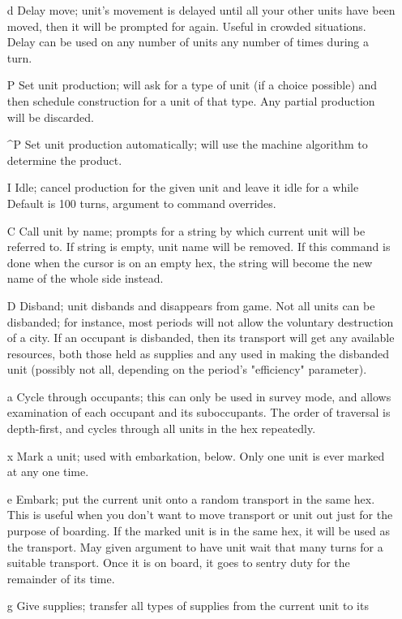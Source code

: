 \begin{itemize}
\item[{d}]
Delay move; unit's movement is delayed until all your other units have been
moved, then it will be prompted for again.  Useful in crowded situations.
Delay can be used on any number of units any number of times during a turn.
\item[{P}]
Set unit production; will ask for a type of unit (if a choice possible) 
and then schedule construction
for a unit of that type.
Any partial production will be discarded.
\item[{\^{}P}]
Set unit production automatically; will use the machine algorithm to
determine the product.  
\item[{I}]
Idle;  cancel production for the given unit and leave it idle for a while
Default is 100 turns, argument to command overrides.
\item[{C}]
Call unit by name; prompts for a string by which current unit
will be referred to.
If string is empty, unit name will be removed.
If this command is done when the cursor is on an empty hex, the string will
become the new name of the whole side instead.
\item[{D}]
Disband; unit disbands and disappears from game.
Not all units can be disbanded; for instance, most periods will not allow
the voluntary destruction of a city.  If an occupant is disbanded, then its
transport will get any available resources, both those held as supplies and
any used in making the disbanded unit (possibly not all, depending on the
period's "efficiency" parameter).
\item[{a}]
Cycle through occupants; this can only be used in survey mode, and allows
examination of each occupant and its suboccupants.  The order of traversal
is depth-first, and cycles through all units in the hex repeatedly.
\item[{x}]
Mark a unit; used with embarkation, below.  Only one unit is ever marked at
any one time.
\item[{e}]
Embark; put the current unit onto a random transport in the same hex.
This is useful
when you don't want to move transport or unit out just for the
purpose of boarding.
If the marked unit is in the same hex,
it will be used as the transport.  May given argument to have unit
wait that many turns for a suitable transport.  Once it is on board,
it goes to sentry duty for the remainder of its time.
\item[{g}]
Give supplies; transfer all types of supplies from the current unit to its

\end{itemize}
